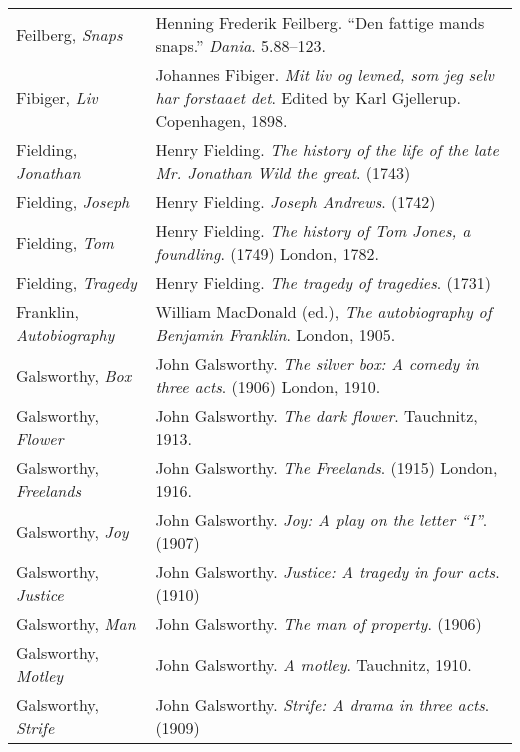 \begin{longtable}{p{} p{}}
Feilberg, \textit{Snaps} & Henning Frederik Feilberg. ``Den fattige mands snaps.'' \textit{Dania}. 5.88--123. \\ %

Fibiger, \textit{Liv} & Johannes Fibiger. \textit{Mit liv og levned, som jeg selv har forstaaet det}. Edited by Karl Gjellerup. Copenhagen, 1898. \\

Fielding, \textit{Jonathan} & Henry Fielding. \textit{The history of the life of the late Mr. Jonathan Wild the great}. (1743) \\ %
Fielding, \textit{Joseph} & Henry Fielding. \textit{Joseph Andrews}. (1742) \\
Fielding, \textit{Tom} & Henry Fielding. \textit{The history of Tom Jones, a foundling}. (1749) London, 1782. \\
Fielding, \textit{Tragedy} & Henry Fielding. \textit{The tragedy of tragedies}. (1731) \\

\raggedright {Franklin, \textit{Autobiography}} & William MacDonald (ed.), \textit{The autobiography of Benjamin Franklin}. London, 1905. \\
%

Galsworthy, \textit{Box} & John Galsworthy. \textit{The silver box: A comedy in three acts}. (1906) London, 1910. \\
Galsworthy, \textit{Flower} & John Galsworthy. \textit{The dark flower}. Tauchnitz, 1913.  \\
Galsworthy, \textit{Freelands} & John Galsworthy. \textit{The Freelands}. (1915) London, 1916. \\
Galsworthy, \textit{Joy} & John Galsworthy. \textit{Joy: A play on the letter ``I''}. (1907) \\ %
Galsworthy, \textit{Justice} & John Galsworthy. \textit{Justice: A tragedy in four acts}. (1910) \\ %
Galsworthy, \textit{Man} & John Galsworthy. \textit{The man of property}. (1906) \\
Galsworthy, \textit{Motley} & John Galsworthy. \textit{A motley}. Tauchnitz, 1910. \\
Galsworthy, \textit{Strife} & John Galsworthy. \textit{Strife: A drama in three acts}. (1909) \\ %


\end{longtable}
